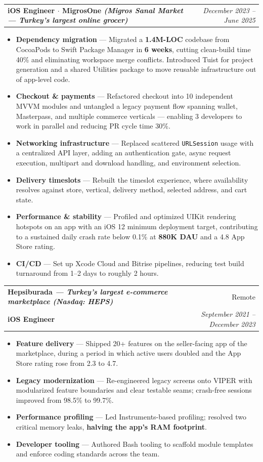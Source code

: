 \documentclass[a4paper,11pt]{article}
\makeatletter
\newcommand{\resumeItem}[2]{
  \item\small{
    \textbf{#1} --- #2\vspace{-2pt}
  }
}
\newcommand{\resumeSubheading}[4]{
  \vspace{2pt}\item
    \begin{tabular*}{0.97\textwidth}[t]{l@{\extracolsep{\fill}}r}
      \textbf{#1} & \small#2 \\
      \small\textbf{#3} & \textit{\small #4} \\
    \end{tabular*}\vspace{-5pt}
}
\newcommand{\resumeSubPosition}[2]{
    \vspace{6pt}
    \begin{tabular*}{0.97\textwidth}{l@{\extracolsep{\fill}}r}
      \small\textbf{#1} & \textit{\small #2} \\
    \end{tabular*}\vspace{-5pt}
}
\newcommand{\resumeItemListStart}{\begin{itemize}}
\newcommand{\resumeItemListEnd}{\end{itemize}\vspace{-5pt}}
\makeatother
\begin{document}
    \resumeSubPosition
      {iOS Engineer $\cdot$ MigrosOne \textnormal{\textit{(Migros Sanal Market --- Turkey's largest online grocer)}}}{December 2023 -- June 2025}
      \resumeItemListStart
        \resumeItem{Dependency migration}
          {Migrated a \textbf{1.4M-LOC} codebase from CocoaPods to Swift Package Manager in \textbf{6 weeks}, cutting clean-build time 40\% and eliminating workspace merge conflicts. Introduced Tuist for project generation and a shared Utilities package to move reusable infrastructure out of app-level code.}
        \resumeItem{Checkout \& payments}
          {Refactored checkout into 10 independent MVVM modules and untangled a legacy payment flow spanning wallet, Masterpass, and multiple commerce verticals --- enabling 3 developers to work in parallel and reducing PR cycle time 30\%.}
        \resumeItem{Networking infrastructure}
          {Replaced scattered \texttt{URLSession} usage with a centralized API layer, adding an authentication gate, async request execution, multipart and download handling, and environment selection.}
        \resumeItem{Delivery timeslots}
          {Rebuilt the timeslot experience, where availability resolves against store, vertical, delivery method, selected address, and cart state.}
        \resumeItem{Performance \& stability}
          {Profiled and optimized UIKit rendering hotspots on an app with an iOS 12 minimum deployment target, contributing to a sustained daily crash rate below 0.1\% at \textbf{880K DAU} and a 4.8 App Store rating.}
        \resumeItem{CI/CD}
          {Set up Xcode Cloud and Bitrise pipelines, reducing test build turnaround from 1--2 days to roughly 2 hours.}
      \resumeItemListEnd

    \pagebreak
    \resumeSubheading
      {Hepsiburada \textnormal{\small\textit{--- Turkey's largest e-commerce marketplace (Nasdaq: HEPS)}}}{Remote}
      {iOS Engineer}{September 2021 -- December 2023}
      \resumeItemListStart
        \resumeItem{Feature delivery}
          {Shipped 20+ features on the seller-facing app of the marketplace, during a period in which active users doubled and the App Store rating rose from 2.3 to 4.7.}
        \resumeItem{Legacy modernization}
          {Re-engineered legacy screens onto VIPER with modularized feature boundaries and clear testable seams; crash-free sessions improved from 98.5\% to 99.7\%.}
        \resumeItem{Performance profiling}
          {Led Instruments-based profiling; resolved two critical memory leaks, \textbf{halving the app's RAM footprint}.}
        \resumeItem{Developer tooling}
          {Authored Bash tooling to scaffold module templates and enforce coding standards across the team.}
      \resumeItemListEnd
\end{document}
